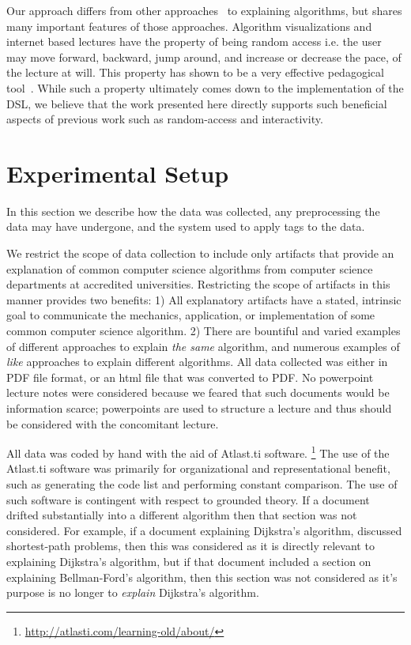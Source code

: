 \documentclass[sigconf]{acmart}
\begin{document}
Our approach differs from other approaches~\cite{brecht2012learning,
  brecht2008enabling} to explaining algorithms, but shares many important
features of those approaches. Algorithm visualizations and internet based
lectures have the property of being random access i.e. the user may move
forward, backward, jump around, and increase or decrease the pace, of the
lecture at will. This property has shown to be a very effective pedagogical
tool~\cite{cardall2008live, zhang2005interactive, zhang2006instructional,
  Schwan2004293, Merkt2011687}.
%
While such a property ultimately comes down to the implementation of the DSL, we
believe that the work presented here directly supports such beneficial aspects
of previous work such as random-access and interactivity.

\section{Experimental Setup}
\label{sec:exp:data}
In this section we describe how the data was collected, any preprocessing the
data may have undergone, and the system used to apply tags to the data. 

We restrict the scope of data collection to include only artifacts that provide
an explanation of common computer science algorithms from computer science
departments at accredited universities. Restricting the scope of artifacts in
this manner provides two benefits: 1) All explanatory artifacts have a stated,
intrinsic goal to communicate the mechanics, application, or implementation of
some common computer science algorithm. 2) There are bountiful and varied
examples of different approaches to explain \emph{the same} algorithm, and
numerous examples of \emph{like} approaches to explain different algorithms. All
data collected was either in PDF file format, or an html file that was converted
to PDF. No powerpoint lecture notes were considered because we feared that such
documents would be information scarce; powerpoints are used to structure a
lecture and thus should be considered with the concomitant lecture.

All data was coded by hand with the aid of Atlast.ti software.%
\footnote{\url{http://atlasti.com/learning-old/about/}}
%
The use of the Atlast.ti software was primarily for organizational and
representational benefit, such as generating the code list and performing
constant comparison.
%
The use of such software is contingent with respect to grounded theory.
%
If a document drifted substantially into a different algorithm then that
section was not considered. For example, if a document explaining Dijkstra's
algorithm, discussed shortest-path problems, then this was considered as it is
directly relevant to explaining Dijkstra's algorithm, but if that document
included a section on explaining Bellman-Ford's algorithm, then this section
was not considered as it's purpose is no longer to \emph{explain} Dijkstra's
algorithm.
\end{document}
